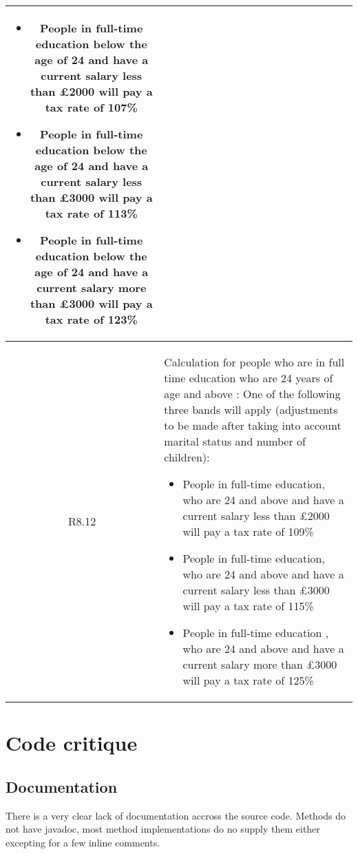\begin{table}[H]
\begin{tabularx}{\textwidth}{| c | X |}
	\begin{itemize}[itemsep=\tableitemsep, leftmargin=\tableleftsep]
		\item People in full-time education below the age of 24 and have a current salary less than £2000 will pay a tax rate of 107\%
		\item People in full-time education below the age of 24 and have a current salary less than £3000 will pay a tax rate of 113\%
		\item People in full-time education below the age of 24 and have a current salary more than £3000 will pay a tax rate of 123\%
	\end{itemize}
	\\
	\hline %
	R8.12 & Calculation for people who are in full time education who are 24 years of age and above : One of the following three bands will apply (adjustments to be made after taking into account marital status and number of children):
	\begin{itemize}[itemsep=\tableitemsep, leftmargin=\tableleftsep]
	\item People in full-time education, who are 24 and above and have a current salary less than £2000 will pay a tax rate of 109\%
	\item People in full-time education, who are 24 and above and have a current salary less than £3000 will pay a tax rate of 115\%
	\item People in full-time education , who are 24 and above and have a current salary more than £3000 will pay a tax rate of 125\%
	\end{itemize}
	\\
	\hline %
\end{tabularx}
\end{table}

\pagebreak
\section{Code critique}
\label{appendix:code-critique}

\subsection{Documentation}
There is a very clear lack of documentation accross the source code. Methods do not have javadoc, most method implementations do no supply them either excepting for a few inline comments. 

